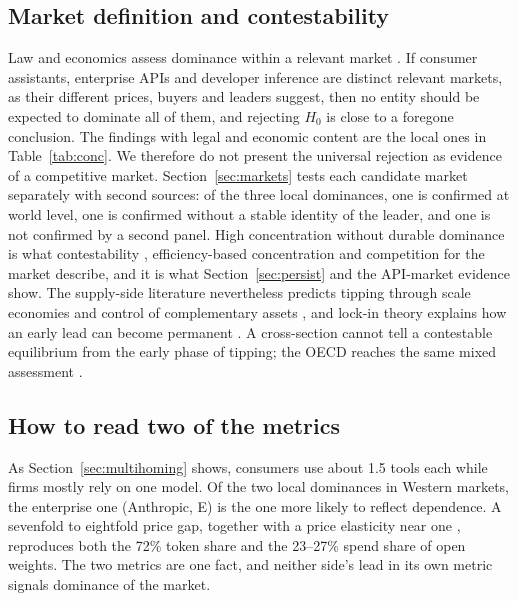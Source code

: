 \documentclass[11pt]{article}
\newcommand{\Hzero}{H_{0}}
\begin{document}
\subsection{Market definition and contestability} Law and economics assess dominance within a relevant market \cite{ec2009guidance,kaplow2010why}. If consumer assistants, enterprise APIs and developer inference are distinct relevant markets, as their different prices, buyers and leaders suggest, then no entity should be expected to dominate all of them, and rejecting $\Hzero$ is close to a foregone conclusion. The findings with legal and economic content are the local ones in Table~\ref{tab:conc}. We therefore do not present the universal rejection as evidence of a competitive market. Section~\ref{sec:markets} tests each candidate market separately with second sources: of the three local dominances, one is confirmed at world level, one is confirmed without a stable identity of the leader, and one is not confirmed by a second panel. High concentration without durable dominance is what contestability \cite{baumol1982contestable}, efficiency-based concentration \cite{demsetz1973industry} and competition for the market \cite{schumpeter1942capitalism} describe, and it is what Section~\ref{sec:persist} and the API-market evidence \cite{demirer2026emerging} show. The supply-side literature nevertheless predicts tipping through scale economies and control of complementary assets \cite{korinek2025concentrating,azoulay2025old}, and lock-in theory explains how an early lead can become permanent \cite{katz1985network,arthur1989competing}. A cross-section cannot tell a contestable equilibrium from the early phase of tipping; the OECD reaches the same mixed assessment \cite{oecd2026markets}.

\subsection{How to read two of the metrics} As Section~\ref{sec:multihoming} shows, consumers use about 1.5 tools each while firms mostly rely on one model. Of the two local dominances in Western markets, the enterprise one (Anthropic, E) is the one more likely to reflect dependence. A sevenfold to eightfold price gap, together with a price elasticity near one \cite{demirer2025emerging}, reproduces both the 72\% token share and the 23--27\% spend share of open weights. The two metrics are one fact, and neither side's lead in its own metric signals dominance of the market.
\end{document}
